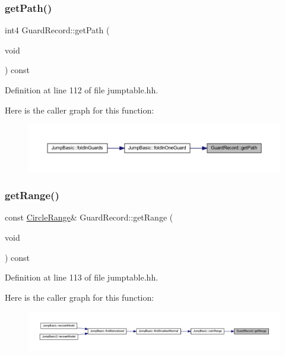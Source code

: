 \subsubsection{\texorpdfstring{getPath()}{getPath()}}
{\footnotesize\ttfamily int4 Guard\+Record\+::get\+Path (\begin{DoxyParamCaption}\item[{void}]{ }\end{DoxyParamCaption}) const\hspace{0.3cm}{\ttfamily [inline]}}



Definition at line 112 of file jumptable.\+hh.

Here is the caller graph for this function\+:
\nopagebreak
\begin{figure}[H]
\begin{center}
\leavevmode
\includegraphics[width=350pt]{class_guard_record_a533e9b8023e2b1887475227690c23034_icgraph}
\end{center}
\end{figure}
\mbox{\label{class_guard_record_acc7133e441cae9b94ae8d543c08f062c}} 
\subsubsection{\texorpdfstring{getRange()}{getRange()}}
{\footnotesize\ttfamily const \mbox{\hyperlink{class_circle_range}{Circle\+Range}}\& Guard\+Record\+::get\+Range (\begin{DoxyParamCaption}\item[{void}]{ }\end{DoxyParamCaption}) const\hspace{0.3cm}{\ttfamily [inline]}}



Definition at line 113 of file jumptable.\+hh.

Here is the caller graph for this function\+:
\nopagebreak
\begin{figure}[H]
\begin{center}
\leavevmode
\includegraphics[width=350pt]{class_guard_record_acc7133e441cae9b94ae8d543c08f062c_icgraph}
\end{center}
\end{figure}
\mbox{\label{class_guard_record_a30724e561041638fb8b93ffb74763a07}} 
